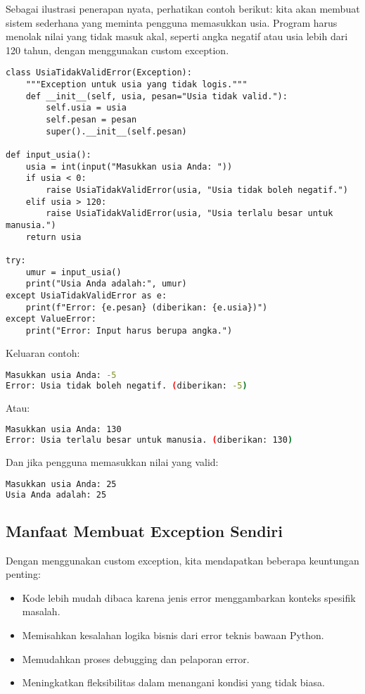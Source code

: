 Sebagai ilustrasi penerapan nyata, perhatikan contoh berikut: kita akan membuat sistem sederhana yang meminta pengguna memasukkan usia. Program harus menolak nilai yang tidak masuk akal, seperti angka negatif atau usia lebih dari 120 tahun, dengan menggunakan custom exception.

\begin{lstlisting}[style=PythonStyle, caption={Studi kasus: validasi input usia dengan custom exception}]
class UsiaTidakValidError(Exception):
    """Exception untuk usia yang tidak logis."""
    def __init__(self, usia, pesan="Usia tidak valid."):
        self.usia = usia
        self.pesan = pesan
        super().__init__(self.pesan)

def input_usia():
    usia = int(input("Masukkan usia Anda: "))
    if usia < 0:
        raise UsiaTidakValidError(usia, "Usia tidak boleh negatif.")
    elif usia > 120:
        raise UsiaTidakValidError(usia, "Usia terlalu besar untuk manusia.")
    return usia

try:
    umur = input_usia()
    print("Usia Anda adalah:", umur)
except UsiaTidakValidError as e:
    print(f"Error: {e.pesan} (diberikan: {e.usia})")
except ValueError:
    print("Error: Input harus berupa angka.")
\end{lstlisting}

Keluaran contoh:

\begin{lstlisting}[language=bash]
Masukkan usia Anda: -5
Error: Usia tidak boleh negatif. (diberikan: -5)
\end{lstlisting}

Atau:

\begin{lstlisting}[language=bash]
Masukkan usia Anda: 130
Error: Usia terlalu besar untuk manusia. (diberikan: 130)
\end{lstlisting}

Dan jika pengguna memasukkan nilai yang valid:

\begin{lstlisting}[language=bash]
Masukkan usia Anda: 25
Usia Anda adalah: 25
\end{lstlisting}

\subsection*{Manfaat Membuat Exception Sendiri}

Dengan menggunakan custom exception, kita mendapatkan beberapa keuntungan penting:
\begin{itemize}
    \item Kode lebih mudah dibaca karena jenis error menggambarkan konteks spesifik masalah.
    \item Memisahkan kesalahan logika bisnis dari error teknis bawaan Python.
    \item Memudahkan proses debugging dan pelaporan error.
    \item Meningkatkan fleksibilitas dalam menangani kondisi yang tidak biasa.
\end{itemize}

